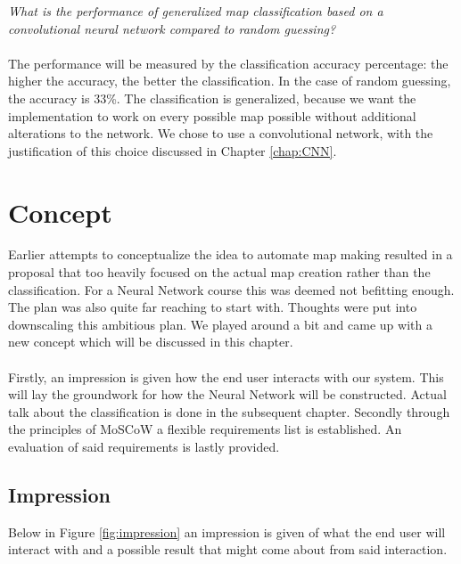 \documentclass[a4paper,onecolumn]{report}
\begin{document}
\emph{What is the performance of generalized map classification based on a convolutional neural network compared to random guessing?}
\\ \\
The performance will be measured by the classification accuracy percentage: the higher the accuracy, the better the classification. In the case of random guessing, the accuracy is 33\%. The classification is generalized, because we want the implementation to work on every possible map possible without additional alterations to the network. We chose to use a convolutional network, with the justification of this choice discussed in Chapter \ref{chap:CNN}.

\chapter{Concept}
\label{chap:concept}
Earlier attempts to conceptualize the idea to automate map making resulted in a proposal that too heavily focused on the actual map creation rather than the classification. For a Neural Network course this was deemed not befitting enough. The plan was also quite far reaching to start with. Thoughts were put into downscaling this ambitious plan. We played around a bit and came up with a new concept which will be discussed in this chapter.\\
\\
Firstly, an impression is given how the end user interacts with our system. This will lay the groundwork for how the Neural Network will be constructed. Actual talk about the classification is done in the subsequent chapter. Secondly through the principles of MoSCoW a flexible requirements list is established. An evaluation of said requirements is lastly provided. 

\section{Impression}

Below in Figure \ref{fig:impression} an impression is given of what the end user will interact with and a possible result that might come about from said interaction.\\
\end{document}
